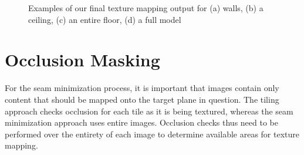 \documentclass[10pt,twocolumn,letterpaper]{article}
\begin{document}
\begin{figure}
  \centering

  \centering

  \centering

  \centering
  \caption{Examples of our final texture mapping output for (a) walls, (b) a
    ceiling, (c) an entire floor, (d) a full model}
  \label{fig:results}
\end{figure}

{\small   }

\appendix
\section{Occlusion Masking}
\label{sec:occlusionMasking}
For the seam minimization process, it is important that images contain
only content that should be mapped onto the target plane in
question. The tiling approach checks occlusion for each tile as it is
being textured, whereas the seam minimization approach uses entire
images.  Occlusion checks thus need to be performed over the entirety
of each image to determine available areas for texture mapping.
\end{document}
